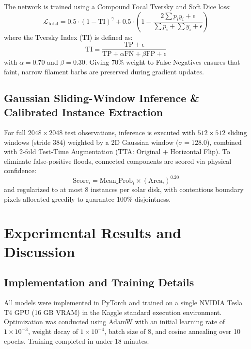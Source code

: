 \documentclass[conference]{IEEEtran}
\begin{document}
The network is trained using a Compound Focal Tversky \cite{salehi2017tversky} and Soft Dice loss:
\begin{equation}
\mathcal{L}_{\text{total}} = 0.5 \cdot \left( 1 - \text{TI} \right)^{\gamma} + 0.5 \cdot \left( 1 - \frac{2 \sum p_i y_i + \epsilon}{\sum p_i + \sum y_i + \epsilon} \right)
\label{eq:loss}
\end{equation}
where the Tversky Index ($\text{TI}$) is defined as:
\begin{equation}
\text{TI} = \frac{\text{TP} + \epsilon}{\text{TP} + \alpha \text{FN} + \beta \text{FP} + \epsilon}
\label{eq:tversky}
\end{equation}
with $\alpha = 0.70$ and $\beta = 0.30$. Giving 70\% weight to False Negatives ensures that faint, narrow filament barbs are preserved during gradient updates.

\subsection{Gaussian Sliding-Window Inference \& Calibrated Instance Extraction}
For full $2048 \times 2048$ test observations, inference is executed with $512 \times 512$ sliding windows (stride 384) weighted by a 2D Gaussian window ($\sigma = 128.0$), combined with 2-fold Test-Time Augmentation (TTA: Original + Horizontal Flip). To eliminate false-positive floods, connected components are scored via physical confidence:
\begin{equation}
\text{Score}_i = \text{Mean\_Prob}_i \times (\text{Area}_i)^{0.20}
\label{eq:score}
\end{equation}
and regularized to at most 8 instances per solar disk, with contentious boundary pixels allocated greedily to guarantee 100\% disjointness.

\section{Experimental Results and Discussion}

\subsection{Implementation and Training Details}
All models were implemented in PyTorch and trained on a single NVIDIA Tesla T4 GPU (16 GB VRAM) in the Kaggle standard execution environment. Optimization was conducted using AdamW with an initial learning rate of $1 \times 10^{-3}$, weight decay of $1 \times 10^{-4}$, batch size of 8, and cosine annealing over 10 epochs. Training completed in under 18 minutes.
\end{document}
